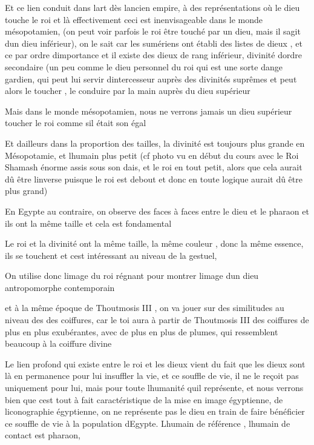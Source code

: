 \documentclass{article}
\begin{document}
Et ce lien conduit dans l{\textquotesingle}art dès
l{\textquotesingle}ancien empire, à des représentations où le dieu
touche le roi et là effectivement ceci est inenvisageable dans le monde
mésopotamien, (on peut voir parfois le roi être touché par un dieu,
mais il s{\textquotesingle}agit d{\textquotesingle}un dieu inférieur),
on le sait car les sumériens ont établi des listes de dieux , et ce par
ordre d{\textquotesingle}importance et il existe des dieux de rang
inférieur, divinité d{\textquotesingle}ordre secondaire (un peu comme
le dieu personnel du roi qui est une sorte d{\textquotesingle}ange
gardien, qui peut lui servir d{\textquotesingle}intercesseur auprès des
divinités suprêmes et peut alors le toucher , le conduire par la main
auprès du dieu supérieur

Mais dans le monde mésopotamien, nous ne verrons jamais un dieu
supérieur toucher le roi comme s{\textquotesingle}il était son égal

Et d{\textquotesingle}ailleurs dans la proportion des tailles, la
divinité est toujours plus grande en Mésopotamie, et
l{\textquotesingle}humain plus petit  (cf photo vu en début du cours
avec le Roi Shamash énorme assis sous son dais, et le roi en tout
petit,  alors que cela aurait dû être l{\textquotesingle}inverse
puisque le roi est debout et donc en toute logique aurait dû être plus
grand)

En Egypte au contraire, on observe des faces à faces entre le dieu et le
pharaon et ils ont la même taille et cela est fondamental 

Le roi et la divinité ont la même taille, la même couleur , donc la même
essence, ils se touchent et c{\textquotesingle}est intéressant au
niveau de la gestuel, 

On utilise donc l{\textquotesingle}image du roi régnant pour montrer
l{\textquotesingle}image d{\textquotesingle}un dieu antropomorphe
contemporain

et à la même époque de Thoutmosis III , on va jouer sur des similitudes
au niveau des des coiffures, car le toi aura à partir de Thoutmosis III
des coiffures de plus en plus exubérantes, avec de plus en plus de
plumes, qui ressemblent beaucoup à la coiffure divine

Le lien  profond qui existe entre le roi et les dieux vient du fait que
les dieux sont là en permanence pour lui insuffler la vie, et ce
souffle de vie, il ne le reçoit pas uniquement pour lui, mais pour
toute l{\textquotesingle}humanité qu{\textquotesingle}il représente, et
nous verrons bien que c{\textquotesingle}est tout à fait
caractéristique de la mise en image égyptienne, de
l{\textquotesingle}iconographie égyptienne, on ne représente pas le
dieu en train de faire bénéficier ce souffle de vie à  la population
d{\textquotesingle}Egypte. L{\textquotesingle}humain de référence ,
l{\textquotesingle}humain de contact est pharaon, 
\end{document}
